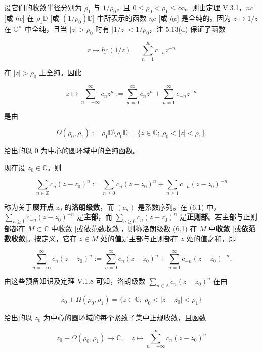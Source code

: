 设它们的收敛半径分别为 $ \rho_{1} $ 与 $ 1/\rho_{0} $，且 $ 0 \le \rho_{0} < \rho_{1} \le \infty $。则由定理 V.3.1，$ nc $ [或 $ hc $] 在 $ \rho_{1}\mathbb{D} $ [或 $ (1/\rho_{0})\mathbb{D} $] 中所表示的函数 $ \underline{nc} $ [或 $ \underline{hc} $] 是全纯的。因为 $ z \mapsto 1/z $ 在 $ \mathbb{C}^{\times} $ 中全纯，且当 $ |z| > \rho_{0} $ 时有 $ |1/z| < 1/\rho_{0} $，注 5.13(d) 保证了函数

\[
z \mapsto \underline{hc}(1/z) = \sum_{n=1}^{\infty} c_{-n}z^{-n}
\]

在 $ |z| > \rho_{0} $ 上全纯。因此

\[
z \mapsto \sum_{n=-\infty}^{\infty} c_{n}z^{n} := \sum_{n=0}^{\infty} c_{n}z^{n} + \sum_{n=1}^{\infty} c_{-n}z^{-n}
\]

是由

\[
\Omega(\rho_{0},\rho_{1}) := \rho_{1}\mathbb{D}\setminus\rho_{0}\overline{\mathbb{D}} = \{ z \in \mathbb{C} ;\ \rho_{0} < |z| < \rho_{1} \} .
\]

给出的以 0 为中心的圆环域中的全纯函数。

现在设 $ z_{0} \in \mathbb{C} $。则

\begin{equation}
\sum_{n\in\mathbb{Z}} c_{n}(z - z_{0})^{n} := \sum_{n\ge 0} c_{n}(z - z_{0})^{n} + \sum_{n\ge 1} c_{-n}(z - z_{0})^{-n}\tag{6.1}
\end{equation}

称为关于\textbf{展开点} $ z_{0} $ 的\textbf{洛朗级数}，而 $ (c_{n}) $ 是系数序列。在 (6.1) 中，$ \sum_{n\ge 1} c_{-n}(z - z_{0})^{-n} $ 是\textbf{主部}，而 $ \sum_{n\ge 0} c_{n}(z - z_{0})^{n} $ 是\textbf{正则部}。若主部与正则部都在 $ M \subset \mathbb{C} $ 中收敛 [或依范数收敛]，则称洛朗级数 (6.1) 在 $ M $ 中\textbf{收敛} [或\textbf{依范数收敛}]。按定义，它在 $ z \in M $ 处的\textbf{值}是主部与正则部在 $ z $ 处的值之和，即

\[
\sum_{n=-\infty}^{\infty} c_{n}(z - z_{0})^{n} := \sum_{n=0}^{\infty} c_{n}(z - z_{0})^{n} + \sum_{n=1}^{\infty} c_{-n}(z - z_{0})^{-n} .
\]

由这些预备知识及定理 V.1.8 可知，洛朗级数 $ \sum_{n\in\mathbb{Z}} c_{n}(z - z_{0})^{n} $ 在由

\[
z_{0} + \Omega(\rho_{0},\rho_{1}) = \{ z \in \mathbb{C} ;\ \rho_{0} < |z - z_{0}| < \rho_{1} \}
\]

给出的以 $ z_{0} $ 为中心的圆环域的每个紧致子集中正规收敛，且函数

\[
z_{0} + \Omega(\rho_{0},\rho_{1}) \to \mathbb{C} , \quad z \mapsto \sum_{n=-\infty}^{\infty} c_{n}(z - z_{0})^{n}
\]

